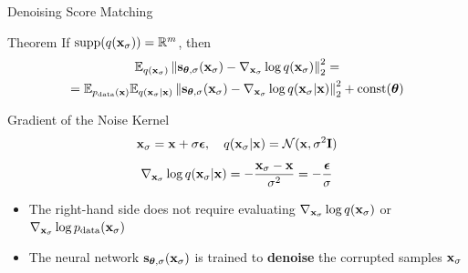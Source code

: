 \documentclass{beamer}
\begin{document}
\begin{frame}{Denoising Score Matching}
	\begin{block}{Theorem}
		If $\text{supp}(q(\mathbf{x}_{\sigma})) = \mathbb{R}^m$, then
		\begin{multline*}
			\mathbb{E}_{q(\mathbf{x}_{\sigma})}\left\| \mathbf{s}_{\boldsymbol{\theta}, \sigma}(\mathbf{x}_{\sigma}) - \nabla_{\mathbf{x}_{\sigma}} \log q(\mathbf{x}_{\sigma}) \right\|_2^2 = \\
			= \mathbb{E}_{p_{\text{data}}(\mathbf{x})} \mathbb{E}_{q(\mathbf{x}_{\sigma} | \mathbf{x})}\left\| \mathbf{s}_{\boldsymbol{\theta}, \sigma}(\mathbf{x}_{\sigma}) - \nabla_{\mathbf{x}_{\sigma}} \log q(\mathbf{x}_{\sigma} | \mathbf{x}) \right\|_2^2 + \text{const}(\boldsymbol{\theta})
		\end{multline*}
		\vspace{-0.5cm}
	\end{block}
    \eqpause
	\begin{block}{Gradient of the Noise Kernel}
		\vspace{-0.3cm}
		\[
			\mathbf{x}_{\sigma} = \mathbf{x} + \sigma \boldsymbol{\epsilon}, \quad q(\mathbf{x}_{\sigma} | \mathbf{x}) = \mathcal{N}(\mathbf{x}, \sigma^2 \mathbf{I})
		\]
		\vspace{-0.3cm}
		\[
			\nabla_{\mathbf{x}_{\sigma}} \log q(\mathbf{x}_{\sigma} | \mathbf{x}) = - \frac{\mathbf{x}_{\sigma} - \mathbf{x}}{\sigma^2}  = - \frac{\boldsymbol{\epsilon}}{\sigma}
		\]
		\vspace{-0.5cm}
	\end{block}
    \eqpause
	\begin{itemize}
		\item The right-hand side does not require evaluating $\nabla_{\mathbf{x}_{\sigma}} \log q(\mathbf{x}_{\sigma})$ or $\nabla_{\mathbf{x}_{\sigma}} \log p_{\text{data}}(\mathbf{x}_{\sigma})$
		\item The neural network $\mathbf{s}_{\boldsymbol{\theta}, \sigma}(\mathbf{x}_{\sigma})$ is trained to \textbf{denoise} the corrupted samples $\mathbf{x}_{\sigma}$
	\end{itemize}
\end{frame}
\end{document}
